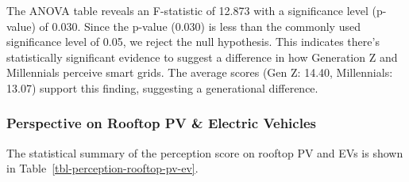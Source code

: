 \documentclass[
  letterpaper,
  DIV=11,
  numbers=noendperiod]{scrartcl}
\begin{document}
The ANOVA table reveals an F-statistic of 12.873 with a significance
level (p-value) of 0.030. Since the p-value (0.030) is less than the
commonly used significance level of 0.05, we reject the null hypothesis.
This indicates there's statistically significant evidence to suggest a
difference in how Generation Z and Millennials perceive smart grids. The
average scores (Gen Z: 14.40, Millennials: 13.07) support this finding,
suggesting a generational difference.

\subsubsection{Perspective on Rooftop PV \& Electric
Vehicles}\label{perspective-on-rooftop-pv-electric-vehicles}

The statistical summary of the perception score on rooftop PV and EVs is
shown in Table~\ref{tbl-perception-rooftop-pv-ev}.
\end{document}
